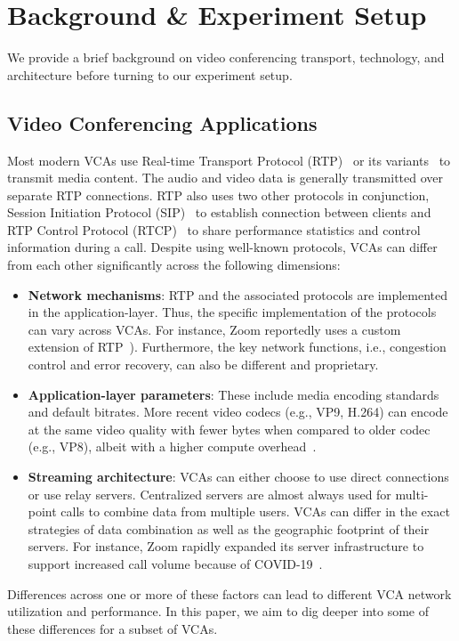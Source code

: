 \section{Background \& Experiment Setup}
\label{sec:background}

We provide a brief background on video conferencing transport, technology, and
architecture before turning to our experiment setup.

\subsection{Video Conferencing Applications}

Most modern VCAs use Real-time Transport Protocol (RTP)~\cite{schulzrinne1996rtp,
schulzrinne2003rfc3550} or its variants~\cite{baugher2004secure, zoom_rtp} to
transmit media content. The audio and video data is generally transmitted over
separate RTP connections. RTP also uses two other protocols in conjunction,
Session Initiation Protocol (SIP)~\cite{rosenberg2002sip} to establish
connection between clients and RTP Control Protocol
(RTCP)~\cite{schulzrinne2003rfc3550} to share performance statistics and
control information during a call. Despite using well-known protocols, VCAs
can differ from each other significantly across the following dimensions:


\begin{itemize}[noitemsep]
    \item \textbf{Network mechanisms}: RTP and the associated protocols are
        implemented in the application-layer. Thus, the specific
        implementation of the protocols can vary across VCAs. For instance,
        Zoom reportedly uses a custom extension of RTP~\cite{zoom_rtp}).
        Furthermore, the key network functions, i.e., congestion control and
        error recovery, can also be different and proprietary. 

    \item \textbf{Application-layer parameters}: These include media encoding
        standards and default bitrates. More recent video codecs (e.g., VP9,
        H.264) can encode at the same video quality with fewer bytes when
        compared to older codec (e.g., VP8), albeit with a higher compute
        overhead~\cite{bienik2016performance}. 
    
    \item \textbf{Streaming architecture}: VCAs can either choose to use
        direct connections or use relay servers. Centralized servers are
        almost always used for multi-point calls to combine data from multiple
        users. VCAs can differ in the exact strategies of data combination as
        well as the geographic footprint of their servers. For instance, Zoom
        rapidly expanded its server infrastructure to support increased call
        volume because of COVID-19~\cite{liu2020characterizing}. 

\end{itemize}
\noindent
Differences across one or more of these factors can lead to different VCA
network utilization and performance. In this paper, we aim to dig deeper into
some of these differences for a subset of VCAs. 


